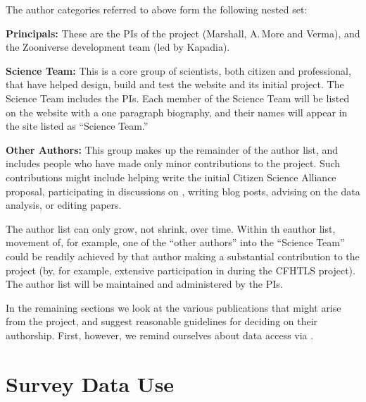 \documentclass[a4paper]{article}
\begin{document}
{\small}

\noindent The author categories referred to above form the following
nested set:  

\begin{description}

\item{\bf Principals:} These are the PIs of the \sw project (Marshall, 
A.\,More and Verma), and the Zooniverse development team (led by
Kapadia).

\item{\bf Science Team:} This is a core group of scientists, both citizen and
professional, that have helped design, build and test the \sw website
and its initial project. The Science Team includes the PIs. Each member
of the Science Team will be listed on the website with a one paragraph
biography, and their names will appear in the \Talk site listed as
``Science Team.''

\item{\bf Other Authors:} This group makes up the remainder of the author
list, and includes people who have made only minor contributions to the
project. Such contributions might include helping write the initial
Citizen Science Alliance proposal, participating in discussions on
\Talk, writing \sw blog posts, advising on the data analysis, or editing
papers.

\end{description}

\noindent The author list can only grow, not shrink, over time. Within
th eauthor list, movement of, for example, one of the ``other authors''
into the ``Science Team'' could be readily achieved by that author
making a substantial contribution to the project (by, for example,
extensive participation in \Talk during the CFHTLS project). The author
list will be maintained and administered by the \sw PIs.

In the remaining sections we look at the various publications that might
arise from the \sw project, and suggest reasonable guidelines for
deciding on their authorship. First, however, we remind ourselves about data
access via \sw.


\section{Survey Data Use}
\label{sec:data}
\end{document}
